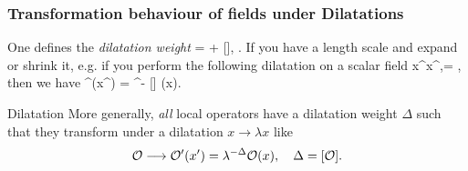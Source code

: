 \subsubsection{Transformation behaviour of fields under Dilatations}
One defines the \emph{dilatation weight} 
\be
\label{eq:cftdilatationweight}
\Delta = + [\mO], \qquad {} \mO.
\ee 
If you have a length scale and expand or shrink it, e.g. if you perform the following dilatation on a scalar field
\bse
x^\mu \rightarrow \lambda x^\mu,\qquad [\phi] = ,
\ese 
then we have
\bse 
\phi {} \phi^\prime (x^\prime) = \lambda^{- [\phi]} \phi(x).
\ese 
\begin{mybox}{Dilatation}
	More generally, \emph{all} local operators have a dilatation weight $\Delta$ such that they transform under a dilatation $x\rightarrow \lambda x$ like
	\begin{equation}
		\mathcal{O} \longrightarrow \mathcal{O}^\prime(x^\prime) = \lambda^{-\Delta} \mathcal{O}(x),\quad \Delta = [\mathcal{O}].
	\end{equation}
\end{mybox}

